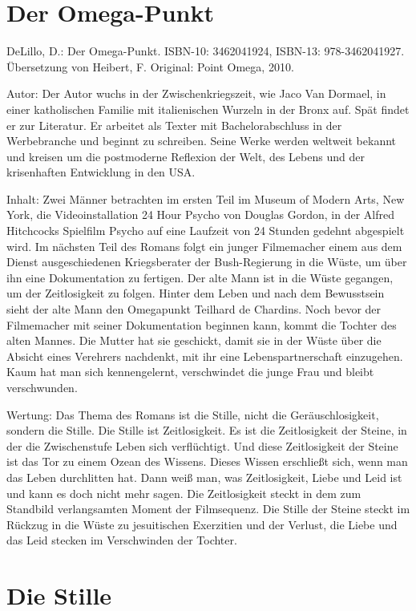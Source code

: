 \documentclass[
  ngerman,
]{article}
\begin{document}
\section{Der Omega-Punkt}\label{der-omega-punkt}

DeLillo, D.: Der Omega-Punkt. ISBN-10: 3462041924, ISBN-13:
978-3462041927. Übersetzung von Heibert, F. Original: Point Omega, 2010.

Autor: Der Autor wuchs in der Zwischenkriegszeit, wie Jaco Van Dormael,
in einer katholischen Familie mit italienischen Wurzeln in der Bronx
auf. Spät findet er zur Literatur. Er arbeitet als Texter mit
Bachelorabschluss in der Werbebranche und beginnt zu schreiben. Seine
Werke werden weltweit bekannt und kreisen um die postmoderne Reflexion
der Welt, des Lebens und der krisenhaften Entwicklung in den USA.

Inhalt: Zwei Männer betrachten im ersten Teil im Museum of Modern Arts,
New York, die Videoinstallation 24 Hour Psycho von Douglas Gordon, in
der Alfred Hitchcocks Spielfilm Psycho auf eine Laufzeit von 24 Stunden
gedehnt abgespielt wird. Im nächsten Teil des Romans folgt ein junger
Filmemacher einem aus dem Dienst ausgeschiedenen Kriegsberater der
Bush-Regierung in die Wüste, um über ihn eine Dokumentation zu fertigen.
Der alte Mann ist in die Wüste gegangen, um der Zeitlosigkeit zu folgen.
Hinter dem Leben und nach dem Bewusstsein sieht der alte Mann den
Omegapunkt Teilhard de Chardins. Noch bevor der Filmemacher mit seiner
Dokumentation beginnen kann, kommt die Tochter des alten Mannes. Die
Mutter hat sie geschickt, damit sie in der Wüste über die Absicht eines
Verehrers nachdenkt, mit ihr eine Lebenspartnerschaft einzugehen. Kaum
hat man sich kennengelernt, verschwindet die junge Frau und bleibt
verschwunden.

Wertung: Das Thema des Romans ist die Stille, nicht die
Geräuschlosigkeit, sondern die Stille. Die Stille ist Zeitlosigkeit. Es
ist die Zeitlosigkeit der Steine, in der die Zwischenstufe Leben sich
verflüchtigt. Und diese Zeitlosigkeit der Steine ist das Tor zu einem
Ozean des Wissens. Dieses Wissen erschließt sich, wenn man das Leben
durchlitten hat. Dann weiß man, was Zeitlosigkeit, Liebe und Leid ist
und kann es doch nicht mehr sagen. Die Zeitlosigkeit steckt in dem zum
Standbild verlangsamten Moment der Filmsequenz. Die Stille der Steine
steckt im Rückzug in die Wüste zu jesuitischen Exerzitien und der
Verlust, die Liebe und das Leid stecken im Verschwinden der Tochter.

\section{Die Stille}\label{die-stille}
\end{document}
